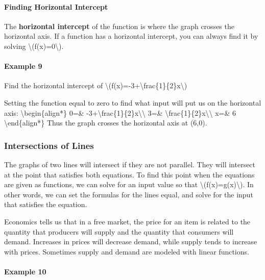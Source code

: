 \hypertarget{finding-horizontal-intercept}{%
\paragraph{Finding Horizontal
Intercept}\label{finding-horizontal-intercept}}

The \textbf{horizontal intercept} of the function is where the graph
crosses the horizontal axis. If a function has a horizontal intercept,
you can always find it by solving
\textbackslash{}(f(x)=0\textbackslash{}).

\hypertarget{example-9}{%
\paragraph{Example 9}\label{example-9}}

Find the horizontal intercept of
\textbackslash{}(f(x)=-3+\textbackslash{}frac\{1\}\{2\}x\textbackslash{})

Setting the function equal to zero to find what input will put us on the
horizontal axis: \textbackslash{}begin\{align*\} 0=\&
-3+\textbackslash{}frac\{1\}\{2\}x\textbackslash{}\textbackslash{} 3=\&
\textbackslash{}frac\{1\}\{2\}x\textbackslash{}\textbackslash{} x=\& 6
\textbackslash{}end\{align*\} Thus the graph crosses the horizontal axis
at (6,0).

\hypertarget{intersections-of-lines}{%
\subsubsection{Intersections of Lines}\label{intersections-of-lines}}

The graphs of two lines will intersect if they are not parallel. They
will intersect at the point that satisfies both equations. To find this
point when the equations are given as functions, we can solve for an
input value so that \textbackslash{}(f(x)=g(x)\textbackslash{}). In
other words, we can set the formulas for the lines equal, and solve for
the input that satisfies the equation.

Economics tells us that in a free market, the price for an item is
related to the quantity that producers will supply and the quantity that
consumers will demand. Increases in prices will decrease demand, while
supply tends to increase with prices. Sometimes supply and demand are
modeled with linear functions.

\hypertarget{example-10}{%
\paragraph{Example 10}\label{example-10}}

